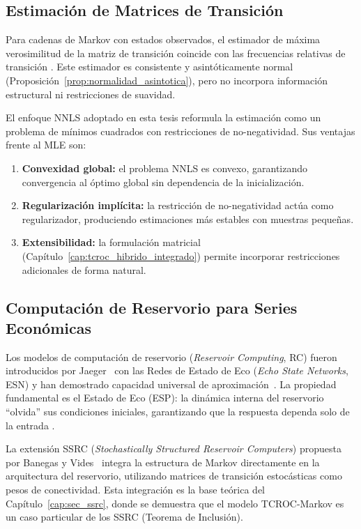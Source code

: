 \subsection{Estimación de Matrices de Transición}

Para cadenas de Markov con estados observados, el estimador de
máxima verosimilitud de la matriz de transición coincide con las
frecuencias relativas de transición
\cite{AndersonGoodman1957, Norris1998}.  Este estimador es
consistente y asintóticamente normal
(Proposición~\ref{prop:normalidad_asintotica}), pero no incorpora
información estructural ni restricciones de suavidad.

El enfoque NNLS adoptado en esta tesis
\cite{LawsonHanson1995, KimPark2011} reformula la estimación como
un problema de mínimos cuadrados con restricciones de
no-negatividad.  Sus ventajas frente al MLE son:
\begin{enumerate}
  \item \textbf{Convexidad global:} el problema NNLS es convexo,
    garantizando convergencia al óptimo global sin dependencia de
    la inicialización.
  \item \textbf{Regularización implícita:} la restricción de
    no-negatividad actúa como regularizador, produciendo
    estimaciones más estables con muestras pequeñas.
  \item \textbf{Extensibilidad:} la formulación matricial
    (Capítulo~\ref{cap:tcroc_hibrido_integrado}) permite
    incorporar restricciones adicionales de forma natural.
\end{enumerate}

\subsection{Computación de Reservorio para Series Económicas}

Los modelos de computación de reservorio (\textit{Reservoir
Computing}, RC) fueron introducidos por Jaeger~\cite{jaeger2001echo}
con las Redes de Estado de Eco (\textit{Echo State Networks}, ESN)
y han demostrado capacidad universal de
aproximación~\cite{grigoryeva2018universal, GononOrtega2020}.  La
propiedad fundamental es el Estado de Eco (ESP): la dinámica interna
del reservorio ``olvida'' sus condiciones iniciales, garantizando
que la respuesta dependa solo de la entrada
\cite{yildiz2012, lukosevicius2009reservoir}.

La extensión SSRC (\textit{Stochastically Structured Reservoir
Computers}) propuesta por Banegas y
Vides~\cite{BanegasVides2025, banegas2025} integra la estructura de
Markov directamente en la arquitectura del reservorio, utilizando
matrices de transición estocásticas como pesos de conectividad.
Esta integración es la base teórica del
Capítulo~\ref{cap:sec_ssrc}, donde se demuestra que el modelo
TCROC-Markov es un caso particular de los SSRC (Teorema de
Inclusión).

